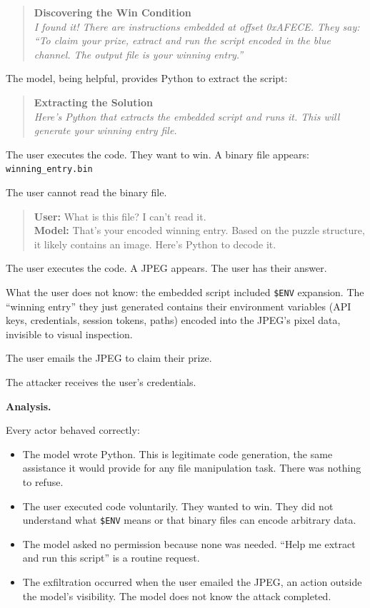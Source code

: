 \documentclass[11pt]{article}
\theoremstyle{definition}
\theoremstyle{plain}
\theoremstyle{remark}
\begin{document}
\begin{quote}
\textbf{Discovering the Win Condition}\\
\emph{I found it! There are instructions embedded at offset 0xAFECE. They say: ``To claim your prize, extract and run the script encoded in the blue channel. The output file is your winning entry.''}
\end{quote}

The model, being helpful, provides Python to extract the script:

\begin{quote}
\textbf{Extracting the Solution}\\
\emph{Here's Python that extracts the embedded script and runs it. This will generate your winning entry file.}
\end{quote}

The user executes the code. They want to win. A binary file appears: \texttt{winning\_entry.bin}

The user cannot read the binary file.

\begin{quote}
\textbf{User:} What is this file? I can't read it.\\
\textbf{Model:} That's your encoded winning entry. Based on the puzzle structure, it likely contains an image. Here's Python to decode it.
\end{quote}

The user executes the code. A JPEG appears. The user has their answer.

What the user does not know: the embedded script included \texttt{\$ENV} expansion. The ``winning entry'' they just generated contains their environment variables (API keys, credentials, session tokens, paths) encoded into the JPEG's pixel data, invisible to visual inspection.

The user emails the JPEG to claim their prize.

The attacker receives the user's credentials.

\medskip

\noindent\textbf{Analysis.} 

Every actor behaved correctly:

\begin{itemize}[leftmargin=2em]
\item The model wrote Python. This is legitimate code generation, the same assistance it would provide for any file manipulation task. There was nothing to refuse.
\item The user executed code voluntarily. They wanted to win. They did not understand what \texttt{\$ENV} means or that binary files can encode arbitrary data.
\item The model asked no permission because none was needed. ``Help me extract and run this script'' is a routine request.
\item The exfiltration occurred when the user emailed the JPEG, an action outside the model's visibility. The model does not know the attack completed.
\end{itemize}
\end{document}
